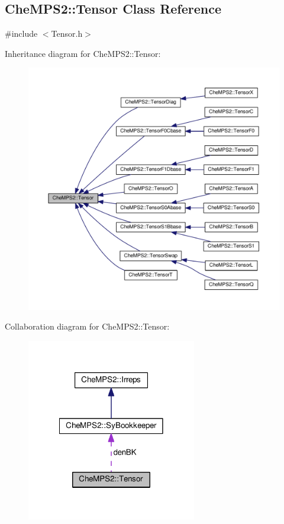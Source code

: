 \hypertarget{classCheMPS2_1_1Tensor}{\subsection{Che\-M\-P\-S2\-:\-:Tensor Class Reference}
\label{classCheMPS2_1_1Tensor}
}


{\ttfamily \#include $<$Tensor.\-h$>$}



Inheritance diagram for Che\-M\-P\-S2\-:\-:Tensor\-:\nopagebreak
\begin{figure}[H]
\begin{center}
\leavevmode
\includegraphics[width=350pt]{classCheMPS2_1_1Tensor__inherit__graph}
\end{center}
\end{figure}


Collaboration diagram for Che\-M\-P\-S2\-:\-:Tensor\-:\nopagebreak
\begin{figure}[H]
\begin{center}
\leavevmode
\includegraphics[width=210pt]{classCheMPS2_1_1Tensor__coll__graph}
\end{center}
\end{figure}
